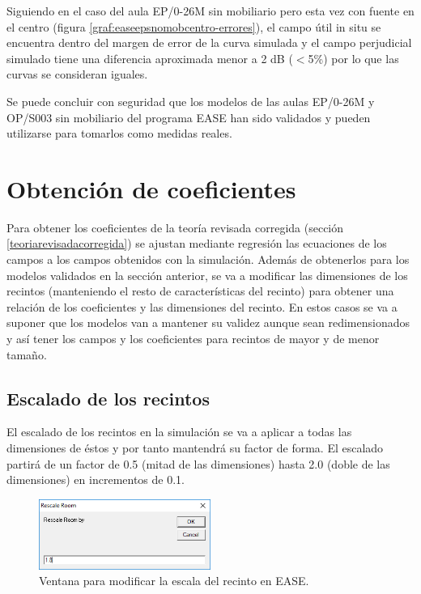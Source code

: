 Siguiendo en el caso del aula EP/0-26M sin mobiliario pero esta vez con fuente en el centro (figura \ref{graf:easeepsnomobcentro-errores}), el campo útil in situ se encuentra dentro del margen de error de la curva simulada y el campo perjudicial simulado tiene una diferencia aproximada menor a 2 dB ($<$5\%) por lo que las curvas se consideran iguales.

Se puede concluir con seguridad que los modelos de las aulas EP/0-26M y OP/S003 sin mobiliario del programa EASE han sido validados y pueden utilizarse para tomarlos como medidas reales.




\section{Obtención de coeficientes}
\label{desarrollo}

Para obtener los coeficientes de la teoría revisada corregida (sección \ref{teoriarevisadacorregida}) se ajustan mediante regresión las ecuaciones de los campos a los campos obtenidos con la simulación.
Además de obtenerlos para los modelos validados en la sección anterior, se va a modificar las dimensiones de los recintos (manteniendo el resto de características del recinto) para obtener una relación de los coeficientes y las dimensiones del recinto. En estos casos se va a suponer que los modelos van a mantener su validez aunque sean redimensionados y así tener los campos y los coeficientes para recintos de mayor y de menor tamaño.


\subsection{Escalado de los recintos}

El escalado de los recintos en la simulación se va a aplicar a todas las dimensiones de éstos y por tanto mantendrá su factor de forma. El escalado partirá de un factor de 0.5 (mitad de las dimensiones) hasta 2.0 (doble de las dimensiones) en incrementos de 0.1.


\begin{figure}[H]
\vspace{-0.3cm}
    \centering
    \includegraphics[width=0.5\textwidth]{archivos/capturas/ventanaescala.png}
    \caption{Ventana para modificar la escala del recinto en EASE.}
\end{figure}


